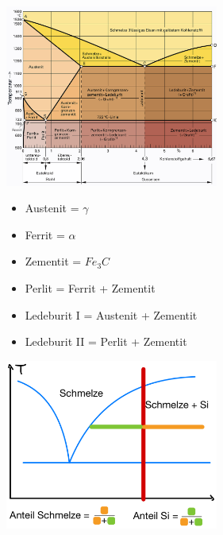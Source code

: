 \includegraphics[width = 70mm]{src/images/Eisenkohlenstoffdiagramm.png}
\begin{minipage}{0.39\linewidth}
    \begin{itemize}
        \item Austenit = $\gamma$\\
        \item Ferrit = $\alpha$\\
        \item Zementit = $Fe_3C$\\
    \end{itemize}
\end{minipage}
\begin{minipage}{0.62\linewidth}
    \begin{itemize}
        \item Perlit = Ferrit + Zementit\\
        \item Ledeburit I = Austenit + Zementit\\
        \item Ledeburit II = Perlit + Zementit\\    
    \end{itemize}
\end{minipage}

\includegraphics[width = 70mm]{src/images/Hebelgesetz.jpeg}

